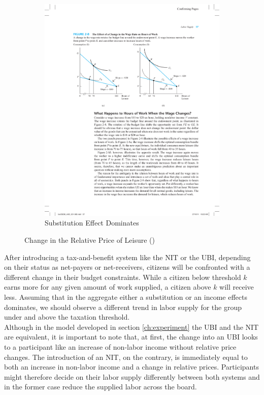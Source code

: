 \begin{figure}[H]
\begin{subfigure}{0.5\textwidth}
    \includegraphics[scale = 0.75]{graphs/budget_line_3-2.pdf}
    \caption{Substitution Effect Dominates}
    \label{graph:budgetline32}
    \end{subfigure}
\caption{Change in the Relative Price of Leisure (\cite{borjas2012})}
\label{graph:price_change}
\end{figure}

After introducing a tax-and-benefit system like the NIT or the UBI, depending on their status as net-payers or net-receivers, citizens will be confronted with a different change in their budget constraints. While a citizen below threshold $k$ earns more for any given amount of work supplied, a citizen above $k$ will receive less. Assuming that in the aggregate either a substitution or an income effects dominates, we should observe a different trend in labor supply for the group under and above the taxation threshold.\\ 

Although in the model developed in section \ref{ch:experiment} the UBI and the NIT are equivalent, it is important to note that, at first, the change into an UBI looks to a participant like an increase of non-labor income without relative price changes. The introduction of an NIT, on the contrary, is immediately equal to both an increase in non-labor income and a change in relative prices. Participants might therefore decide on their labor supply differently between both systems and in the former case reduce the supplied labor across the board.

